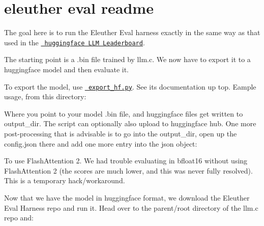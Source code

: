 \chapter{eleuther eval readme}
\hypertarget{md_OriginalStuff_2dev_2eval_2README}{}\label{md_OriginalStuff_2dev_2eval_2README}
\label{md_OriginalStuff_2dev_2eval_2README_autotoc_md95}%
%


The goal here is to run the Eleuther Eval harness exactly in the same way as that used in the \href{https://huggingface.co/spaces/open-llm-leaderboard/open_llm_leaderboard}{\texttt{ huggingface LLM Leaderboard}}.

The starting point is a {\ttfamily .bin} file trained by llm.\+c. We now have to export it to a huggingface model and then evaluate it.

To export the model, use \href{export_hf.py}{\texttt{ export\+\_\+hf.\+py}}. See its documentation up top. Eample usage, from this directory\+:


\begin{DoxyCode}{0}

\end{DoxyCode}


Where you point to your model .bin file, and huggingface files get written to output\+\_\+dir. The script can optionally also upload to huggingface hub. One more post-\/processing that is advisable is to go into the {\ttfamily output\+\_\+dir}, open up the {\ttfamily config.\+json} there and add one more entry into the json object\+:


\begin{DoxyCode}{0}

\end{DoxyCode}


To use Flash\+Attention 2. We had trouble evaluating in bfloat16 without using Flash\+Attention 2 (the scores are much lower, and this was never fully resolved). This is a temporary hack/workaround.

Now that we have the model in huggingface format, we download the Eleuther Eval Harness repo and run it. Head over to the parent/root directory of the llm.\+c repo and\+:


\begin{DoxyCode}{0}

\end{DoxyCode}


